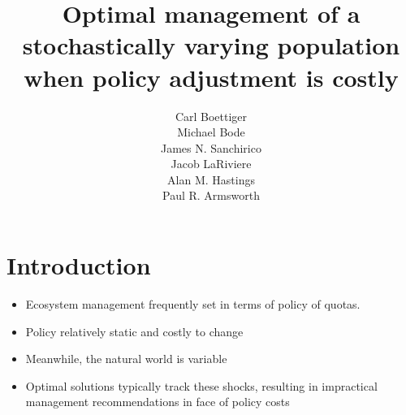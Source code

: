 \documentclass{article}\usepackage[]{graphicx}\usepackage[]{color}
\makeatletter
\newenvironment{kframe}{%
 \def\at@end@of@kframe{}%
 \ifinner\ifhmode%
  \def\at@end@of@kframe{\end{minipage}}%
  \begin{minipage}{\columnwidth}%
 \fi\fi%
 \def\FrameCommand##1{\hskip\@totalleftmargin \hskip-\fboxsep
 \colorbox{shadecolor}{##1}\hskip-\fboxsep
     \hskip-\linewidth \hskip-\@totalleftmargin \hskip\columnwidth}%
 \MakeFramed {\advance\hsize-\width
   \@totalleftmargin\z@ \linewidth\hsize
   \@setminipage}}%
 {\par\unskip\endMakeFramed%
 \at@end@of@kframe}
\newenvironment{knitrout}{}{} %
\makeatother
\begin{document}
\begin{knitrout}
\color{fgcolor}\begin{kframe}


{\ttfamily\noindent\itshape\color{messagecolor}{\#\# Loading required package: pdgControl\\\#\# Loading required package: reshape2\\\#\# Loading required package: ggplot2\\\#\# Loading required package: data.table\\\#\# Loading required package: plyr\\\#\# Loading required package: xtable}}\end{kframe}
\end{knitrout}







\title{Optimal management of a stochastically varying population when policy adjustment is costly} 


\author{Carl Boettiger    \\
       Michael Bode      \\
        James N. Sanchirico \\
Jacob LaRiviere \\
Alan M. Hastings\\
Paul R. Armsworth
}




\maketitle


\section{Introduction}



\begin{itemize}
  \item Ecosystem management frequently set in terms of policy of quotas. 
  \item Policy relatively static and costly to change
  \item Meanwhile, the natural world is variable
  \item Optimal solutions typically track these shocks, resulting in impractical management recommendations in face of policy costs
\end{itemize}
\end{document}
